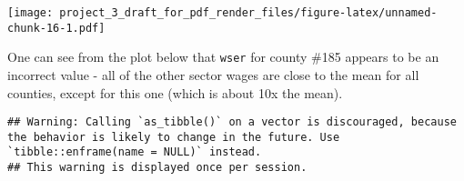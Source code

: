 \documentclass[]{article}
\newenvironment{Shaded}{\begin{snugshade}}{\end{snugshade}}
\newcommand{\DataTypeTok}[1]{\textcolor[rgb]{0.13,0.29,0.53}{#1}}
\newcommand{\KeywordTok}[1]{\textcolor[rgb]{0.13,0.29,0.53}{\textbf{#1}}}
\newcommand{\NormalTok}[1]{#1}
\newcommand{\OperatorTok}[1]{\textcolor[rgb]{0.81,0.36,0.00}{\textbf{#1}}}
\newcommand{\StringTok}[1]{\textcolor[rgb]{0.31,0.60,0.02}{#1}}
\begin{document}
\texttt{[image: project\_3\_draft\_for\_pdf\_render\_files/figure-latex/unnamed-chunk-16-1.pdf]}

One can see from the plot below that \texttt{wser} for county \#185
appears to be an incorrect value - all of the other sector wages are
close to the mean for all counties, except for this one (which is about
10x the mean).

\begin{Shaded}
\end{Shaded}

\begin{verbatim}
## Warning: Calling `as_tibble()` on a vector is discouraged, because the behavior is likely to change in the future. Use `tibble::enframe(name = NULL)` instead.
## This warning is displayed once per session.
\end{verbatim}
\end{document}
